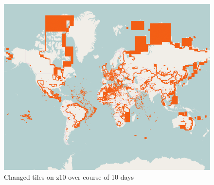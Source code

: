 \begin{figure}[H]
  \centering
  \includegraphics[width=1\textwidth]{images/changed_tiles_z10.png}
  \caption{Changed tiles on z10 over course of 10 days}
\end{figure}
